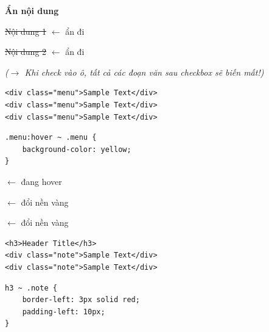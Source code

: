 \documentclass[11pt,oneside]{book}
\begin{document}
\begin{browserWindow}
\sffamily\small
{} {\small\textbf{Ẩn nội dung}} \par\vspace{4pt}
\textcolor{gray!50}{\sout{Nội dung 1}} {\small\textcolor{gray!60}{$\leftarrow$ ẩn đi}} \par\vspace{2pt}
\textcolor{gray!50}{\sout{Nội dung 2}} {\small\textcolor{gray!60}{$\leftarrow$ ẩn đi}} \par\vspace{4pt}
\textcolor{gray!70}{\small\textit{($\rightarrow$ Khi check vào ô, tất cả các đoạn văn sau checkbox sẽ biến mất!)}}
\end{browserWindow}

\begin{codeWindow}
\begin{lstlisting}[language=HTML5]
<div class="menu">Sample Text</div>
<div class="menu">Sample Text</div>
<div class="menu">Sample Text</div>
\end{lstlisting}

\begin{lstlisting}[language=CSS3]
.menu:hover ~ .menu {
    background-color: yellow;
}
\end{lstlisting}
\end{codeWindow}

\begin{browserWindow}
\sffamily\small
{} {\small\textcolor{gray!60}{$\leftarrow$ đang hover}} \par\vspace{3pt}
 {\small\textcolor{gray!60}{$\leftarrow$ đổi nền vàng}} \par\vspace{3pt}
 {\small\textcolor{gray!60}{$\leftarrow$ đổi nền vàng}}
\end{browserWindow}

\begin{codeWindow}
\begin{lstlisting}[language=HTML5]
<h3>Header Title</h3>
<div class="note">Sample Text</div>
<div class="note">Sample Text</div>
\end{lstlisting}

\begin{lstlisting}[language=CSS3]
h3 ~ .note {
    border-left: 3px solid red;
    padding-left: 10px;
}
\end{lstlisting}
\end{codeWindow}
\end{document}
